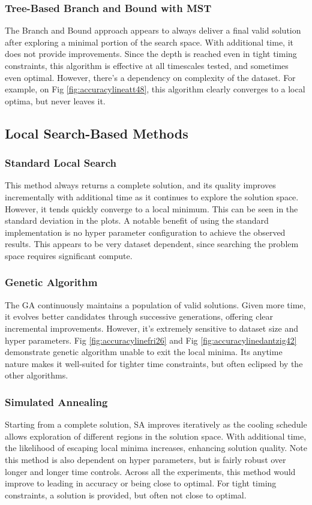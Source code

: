 \documentclass[11pt]{article}
\begin{document}
	\subsubsection{Tree-Based Branch and Bound with MST} 
	The Branch and Bound approach appears to always deliver a final valid solution after exploring a minimal portion of the search space. With additional time, it does not provide improvements. Since the depth is reached even in tight timing constraints, this algorithm is effective at all timescales tested, and sometimes even optimal. However, there's a dependency on complexity of the dataset. For example, on Fig \ref{fig:accuracylineatt48}, this algorithm clearly converges to a local optima, but never leaves it.
	
	\subsection{Local Search-Based Methods}
	\subsubsection{Standard Local Search}
	This method always returns a complete solution, and its quality improves incrementally with additional time as it continues to explore the solution space. However, it tends quickly converge to a local minimum. This can be seen in the standard deviation in the plots. A notable benefit of using the standard implementation is no hyper parameter configuration to achieve the observed results. This appears to be very dataset dependent, since searching the problem space requires significant compute. 
	
	\subsubsection{Genetic Algorithm} 
	The GA continuously maintains a population of valid solutions. Given more time, it evolves better candidates through successive generations, offering clear incremental improvements. However, it's extremely sensitive to dataset size and hyper parameters. Fig \ref{fig:accuracylinefri26} and Fig \ref{fig:accuracylinedantzig42} demonstrate genetic algorithm unable to exit the local minima. Its anytime nature makes it well-suited for tighter time constraints, but often eclipsed by the other algorithms.
	
	\subsubsection{Simulated Annealing} 
	Starting from a complete solution, SA improves iteratively as the cooling schedule allows exploration of different regions in the solution space. With additional time, the likelihood of escaping local minima increases, enhancing solution quality. Note this method is also dependent on hyper parameters, but is fairly robust over longer and longer time controls. Across all the experiments, this method would improve to leading in accuracy or being close to optimal. For tight timing constraints, a solution is provided, but often not close to optimal.
	
\end{document}

